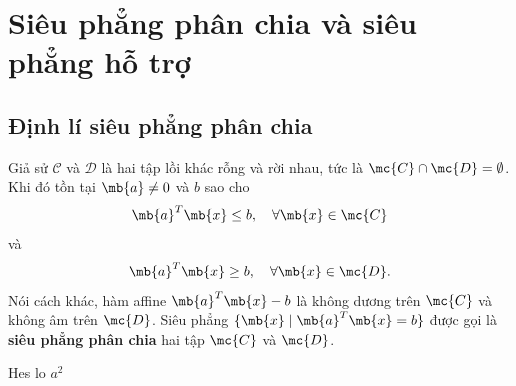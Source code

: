 \section{Siêu phẳng phân chia và siêu phẳng hỗ trợ}
\label{section:separating_and_supporting_hyperplanes}

\subsection{Định lí siêu phẳng phân chia}
\begin{theorem}
    Giả sử $\mathcal{C}$ và $\mathcal{D}$ là hai tập lồi khác rỗng và rời nhau, tức là $\mc{C} \cap \mc{D} = \emptyset$. Khi đó tồn tại $\mb{a} \neq 0$ và $b$ sao cho  
    \[
    \mb{a}^T \mb{x} \leq b, \quad \forall \mb{x} \in \mc{C}
    \]
    và  
    \[
    \mb{a}^T \mb{x} \geq b, \quad \forall \mb{x} \in \mc{D}.
    \]
    Nói cách khác, hàm affine $\mb{a}^T \mb{x} - b$ là không dương trên $\mc{C}$ và không âm trên $\mc{D}$.  
    Siêu phẳng $\{\mb{x} \mid \mb{a}^T \mb{x} = b\}$ được gọi là \textbf{siêu phẳng phân chia} hai tập $\mc{C}$ và $\mc{D}$.
\end{theorem}

Hes lo
\( a^2\)